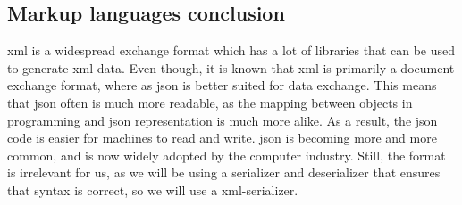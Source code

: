 \subsection{Markup languages conclusion}
\gls{xml} is a widespread exchange format which has a lot of libraries that can be used to generate \gls{xml} data. Even though, it is known that \gls{xml} is primarily a document exchange format, where as \gls{json} is better suited for data exchange. This means that \gls{json} often is much more readable, as the mapping between objects in programming and \gls{json} representation is much more alike. As a result, the \gls{json} code is easier for machines to read and write. \gls{json} is becoming more and more common, and is now widely adopted by the computer industry. Still, the format is irrelevant for us, as we will be using a serializer and deserializer that ensures that syntax is correct, so we will use a \gls{xml}-serializer. 